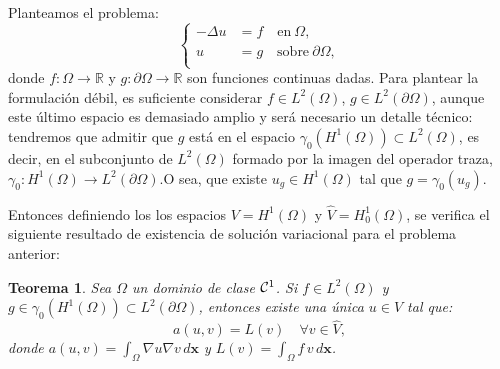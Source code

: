 \documentclass[11pt]{report}
\theoremstyle{plain}
\newtheorem{theorem}{Teorema}[chapter]
\theoremstyle{definition}
\newcommand{\R}{\ensuremath{\mathbb{R}}}
\newcommand{\xx}{\ensuremath{\mathbf{x}}\xspace}
\newcommand{\grad}{\ensuremath{\nabla}}
\newcommand{\en}{\quad\text{en}\ }
\newcommand{\sobre}{\quad\text{sobre}\ }
\newcommand{\classC}[2]{%
  \ensuremath{
   \ifthenelse{\equal{#2}{}}
    {\mathcal{C}^{#1}}
    {\mathcal{C}^{#1}(#2)}
  }
}
\begin{document}
Planteamos el problema: 
\begin{equation}
	\left\{
	\begin{aligned}
		-\Delta u & = f \en{\Omega},            \\
		u         & = g \sobre{\partial\Omega}, \\
	\end{aligned}
	\right.
	\label{eq:poisson.dirichlet.NO.homog}
\end{equation}
donde $f:\Omega\to\R$ y $g:\partial\Omega\to\R$ son funciones continuas dadas. Para plantear la formulación débil, es suficiente considerar $f\in L^2(\Omega)$, $g\in L^2(\partial\Omega)$, aunque este último espacio es demasiado amplio y será necesario un detalle técnico: tendremos que admitir que $g$ está en el espacio $\gamma_0(H^1(\Omega))\subset L^2(\Omega)$, es decir, en el subconjunto de $L^2(\Omega)$ formado por la imagen del operador traza, $\gamma_0:H^1(\Omega)\to L^2(\partial\Omega)$.O sea, que existe $u_g\in H^1(\Omega)$ tal que $g=\gamma_0(u_g)$.  




Entonces definiendo los los espacios $V=H^1(\Omega)$ y $\widehat V = H_0^1(\Omega)$, se verifica el siguiente resultado de existencia de solución variacional para el problema anterior:
\begin{theorem}
  Sea $\Omega$ un dominio de clase $\classC1{}$.   Si $f\in L^2(\Omega)$ y $g\in \gamma_0(H^1(\Omega)) \subset L^2(\partial\Omega)$, entonces existe una única $u\in V$ tal que:
  \begin{equation}
    \label{eq:poisson.form.variacional}
    a(u,v) = L(v) \quad\forall v\in \widehat V,
  \end{equation}
  donde $a(u,v) = \int_\Omega \grad u\grad v\, d\xx$ y $L(v) = \int_\Omega f\, v\, d\xx$.
\end{theorem}
\end{document}
